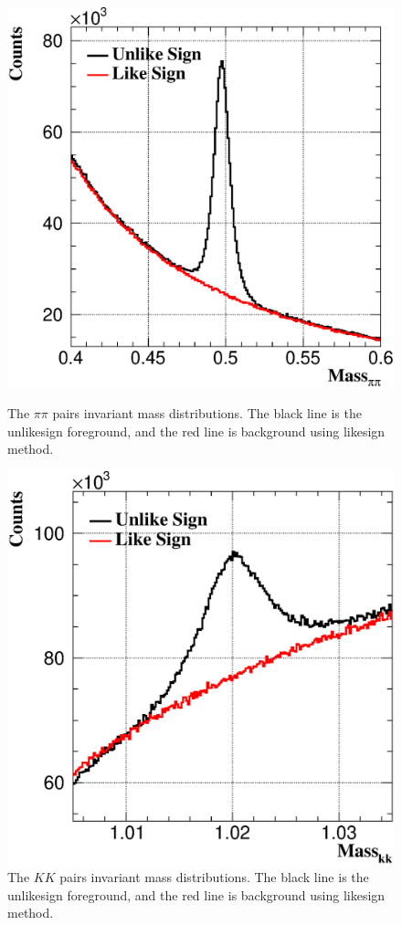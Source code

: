 \documentclass[a4paper]{article}
\begin{document}
\begin{figure}[htbp]
\begin{minipage}[htbp]{0.52\linewidth}
\centering
\includegraphics[width=1.0\textwidth]{fig/massKshort.eps}
\caption{The $\pi\pi$ pairs invariant mass distributions. The black line is the unlikesign foreground, and the red line is background using likesign method. \label{fig:ksmass}}
\end{minipage}
\hfill
\begin{minipage}[htbp]{0.52\linewidth}
\centering
\includegraphics[width=1.0\textwidth]{fig/massPhi.eps} 
\caption{The $KK$ pairs invariant mass distributions. The black line is the unlikesign foreground, and the red line is background using likesign method. \label{fig:phimass}}
\end{minipage}
\end{figure}
\end{document}
